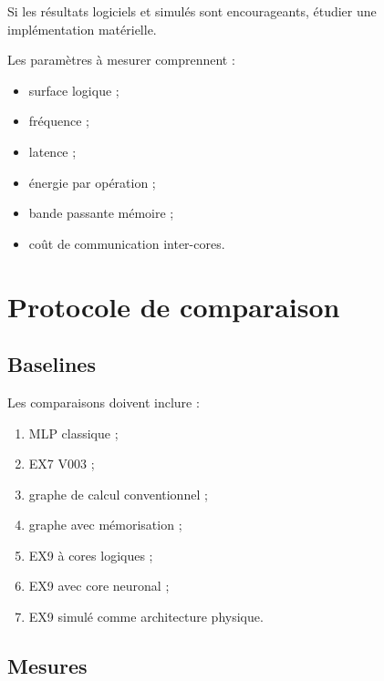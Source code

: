 \documentclass[11pt,a4paper]{article}
\begin{document}
Si les résultats logiciels et simulés sont encourageants, étudier
une implémentation matérielle.

Les paramètres à mesurer comprennent :
\begin{itemize}
  \item surface logique ;
  \item fréquence ;
  \item latence ;
  \item énergie par opération ;
  \item bande passante mémoire ;
  \item coût de communication inter-cores.
\end{itemize}

\section{Protocole de comparaison}

\subsection{Baselines}

Les comparaisons doivent inclure :

\begin{enumerate}
  \item MLP classique ;
  \item EX7 V003 ;
  \item graphe de calcul conventionnel ;
  \item graphe avec mémorisation ;
  \item EX9 à cores logiques ;
  \item EX9 avec core neuronal ;
  \item EX9 simulé comme architecture physique.
\end{enumerate}

\subsection{Mesures}
\end{document}
